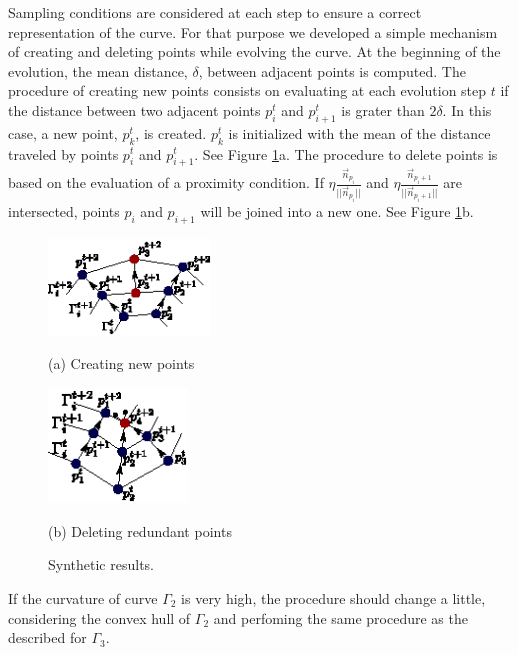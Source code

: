 \documentclass{article}
\begin{document}
Sampling conditions are considered at each step to ensure a correct representation of the curve. For that purpose we developed a simple mechanism of creating and deleting points while evolving the curve. At the beginning of the evolution, the mean distance, $\delta$, between adjacent points is computed. The procedure of creating new points consists on evaluating at each evolution step $t$ if the distance between two adjacent points $p_i^t$ and $p_{i+1}^t$ is grater than $2\delta$. In this case, a new point, $p_k^t$, is created. $p_k^t$ is initialized with the mean of the distance traveled by points $p_i^t$ and $p_{i+1}^t$. See Figure \ref{fig:nacimiento_y_muerte}a. The procedure to delete points is based on the evaluation of a proximity condition. If $\eta\frac{\vec{n}_{p_i}}{||\vec{n}_{p_i}||}$ and $\eta\frac{\vec{n}_{p_i+1}}{||\vec{n}_{p_i+1}||}$ are intersected, points $p_i$ and $p_{i+1}$ will be joined into a new one. See Figure \ref{fig:nacimiento_y_muerte}b.
\begin{figure}[t]
  \begin{minipage}[b]{.5\linewidth}
    \centering
    \centerline{\includegraphics[width=4.3cm]{pics/nacimiento}}
    \centerline{(a) Creating new points}\medskip
  \end{minipage}
  \hfill
  \begin{minipage}[b]{.48\linewidth}
    \centering
    \centerline{\includegraphics[width=3.7cm]{pics/muerte}}
    \centerline{(b) Deleting redundant points}\medskip
  \end{minipage}
  \caption{Synthetic results.}
  \label{fig:nacimiento_y_muerte}
\end{figure}
If the curvature of curve $\Gamma_2$ is very high, the procedure should change a little, considering the convex hull of $\Gamma_2$ and perfoming the same procedure as the described for $\Gamma_3$.
\end{document}
